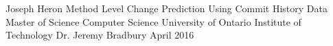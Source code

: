 

\usepackage{tabularx}
\usepackage{hyperref}
\usepackage{url}


\usepackage{rotating}
\usepackage{pdflscape}

\hypersetup{
    colorlinks,
    citecolor=black,
    filecolor=black,
    linkcolor=black,
    urlcolor=black
}



\thesisTitle
  {Joseph Heron}
  {Method Level Change Prediction Using Commit History Data}
  {Master of Science}
  {Computer Science}
  {University of Ontario Institute of Technology}
  {Dr. Jeremy Bradbury}
  {April}
  {2016}




\singlespacing
\tableofcontents
\listoffigures
\listoftables
\lstlistoflistings
\printglossary[style=list]
\clearpage
\doublespacing



%




%






